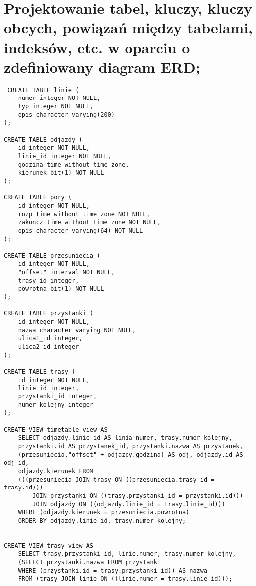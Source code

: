 \section{Projektowanie tabel, kluczy, kluczy obcych, powiązań między tabelami, indeksów, etc. w oparciu o zdefiniowany diagram ERD;} 



\begin{verbatim}
 CREATE TABLE linie (
    numer integer NOT NULL,
    typ integer NOT NULL,
    opis character varying(200)
);

CREATE TABLE odjazdy (
    id integer NOT NULL,
    linie_id integer NOT NULL,
    godzina time without time zone,
    kierunek bit(1) NOT NULL
);

CREATE TABLE pory (
    id integer NOT NULL,
    rozp time without time zone NOT NULL,
    zakoncz time without time zone NOT NULL,
    opis character varying(64) NOT NULL
);

CREATE TABLE przesuniecia (
    id integer NOT NULL,
    "offset" interval NOT NULL,
    trasy_id integer,
    powrotna bit(1) NOT NULL
);

CREATE TABLE przystanki (
    id integer NOT NULL,
    nazwa character varying NOT NULL,
    ulica1_id integer,
    ulica2_id integer
);

CREATE TABLE trasy (
    id integer NOT NULL,
    linie_id integer,
    przystanki_id integer,
    numer_kolejny integer
);

CREATE VIEW timetable_view AS
    SELECT odjazdy.linie_id AS linia_numer, trasy.numer_kolejny, 
    przystanki.id AS przystanek_id, przystanki.nazwa AS przystanek, 
    (przesuniecia."offset" + odjazdy.godzina) AS odj, odjazdy.id AS odj_id, 
    odjazdy.kierunek FROM 
    (((przesuniecia JOIN trasy ON ((przesuniecia.trasy_id = trasy.id))) 
        JOIN przystanki ON ((trasy.przystanki_id = przystanki.id))) 
        JOIN odjazdy ON ((odjazdy.linie_id = trasy.linie_id))) 
    WHERE (odjazdy.kierunek = przesuniecia.powrotna) 
    ORDER BY odjazdy.linie_id, trasy.numer_kolejny;


CREATE VIEW trasy_view AS
    SELECT trasy.przystanki_id, linie.numer, trasy.numer_kolejny, 
    (SELECT przystanki.nazwa FROM przystanki 
    WHERE (przystanki.id = trasy.przystanki_id)) AS nazwa 
    FROM (trasy JOIN linie ON ((linie.numer = trasy.linie_id)));



\end{verbatim}
